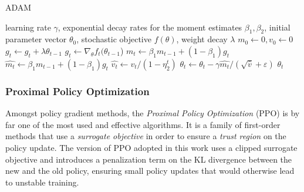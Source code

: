 \begin{algorithm}[H]
    \caption{ADAM}
    \label{alg:adam}
    \begin{algorithmic}[1]
        \Require learning rate $\gamma$, exponential decay rates for the moment estimates $\beta_1, \beta_2$, initial parameter vector $\theta_0$, stochastic objective $f(\theta)$, weight decay $\lambda$
        \Require $m_0 \leftarrow 0, v_0 \leftarrow 0$
        \State $g_t \leftarrow g_t + \lambda\theta_{t-1}$
        \EndIf
        \State $g_t \leftarrow \nabla _{\theta} f_t (\theta_{t-1}$)
        \State $m_t \leftarrow \beta_1 m_{t-1} + (1-\beta_1)g_t$
        \State $\hat{m_t} \leftarrow \beta_1 m_{t-1} + (1-\beta_1)g_t$
        \State $\hat{v_t} \leftarrow v_t / (1-\eta_2 ^t)$
        \State $\theta_t \leftarrow \theta_t - \gamma \hat{m_t} / (\sqrt{\hat{v}} + \varepsilon)$
        \EndFor
        \Return $\theta_t$
    \end{algorithmic}
\end{algorithm}

\subsubsection{Proximal Policy Optimization}

Amongst policy gradient methods, the \textit{Proximal Policy Optimization} (\ac{PPO}) is by far one of the most used and effective algorithms. It is a family of first-order methods that use a \textit{surrogate objective} in order to ensure a \textit{trust region} on the policy update. The version of \ac{PPO} adopted in this work uses a clipped surrogate objective and introduces a penalization term on the \ac{KL} divergence between the new and the old policy, ensuring small policy updates that would otherwise lead to unstable training.

